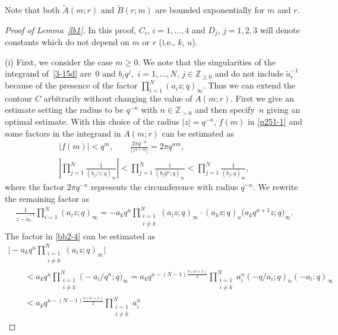 \documentclass[pdftex]{sigma}
\numberwithin{equation}{section}
\def\i{\infty}
\def\Z{\mathbb{Z}}
\begin{document}
 Note that
 both $\tilde{A}(m;r)$ and $\tilde{B}(r;m)$ are bounded exponentially for $m$ and $r$.

\begin{proof}[Proof of Lemma~\ref{lb1}]
In this proof, $C_i$, $i=1,\dots,4$ and $D_j$, $j=1,2,3$ will denote constants which do not depend on $m$ or $r$ (i.e., $k$, $u$).

(i) First, we consider the case $m\ge 0$.
We note that the singularities of the integrand of~\eqref{3-15d} are~$0$ and $b_iq^j,$ $i=1,\dots,N$, $j\in\Z_{\ge0}$ and do not include $\tilde{a}_r^{-1}$
because of the presence of the factor $\prod_{i=1}^N(a_iz;q)_{\i}$. Thus we can extend the contour $C$ arbitrarily without changing
the value of $A(m;r)$. First we give an estimate setting the radius to be $q^{-n}$ with $n\in\Z_{>0}$ and then specify~$n$ giving an optimal estimate. With this choice of the radius $|z|=q^{-n}$, $f(m)$ in \eqref{p251-1} and some factors in the integrand in $A(m;r)$
can be estimated as
\begin{gather}
 |f(m)|<q^m,
\qquad
 \frac{2\pi q^{-n}}{|z^{1+m}|}=2\pi q^{n m},\nonumber
\\
 \left|\prod_{j=1}^N\frac{1}{(b_j/z;q)_{\i}}\right|
 <\prod_{j=1}^N\frac{1}{(b_j q^n;q)_{\i}}
 <\prod_{j=1}^N\frac{1}{(b_j;q)_{\i}},\label{bb2-3}
\end{gather}
where the factor $2\pi q^{-n}$ represents
the circumference with radius $q^{-n}$.
We rewrite the remaining factor as
\begin{align}
\label{bb2-4}
 \frac{1}{z-\tilde{a}_{r}^{-1}}
 \prod_{i=1}^N(a_i z;q)_{\i}
 =
 -a_k q^{u}
 \prod_{\substack{i=1\\i\neq k}}^N(a_i z;q)_{\i}
 \cdot (a_k z;q)_{u} \big(a_k q^{u+1}z;q\big)_{\i}.
\end{align}
The factor \smash{$-a_kq^u\prod_{\substack{i=1\\i\neq k}}^N(a_i z;q)_{\i}$} in \eqref{bb2-4} can be estimated as
\begin{gather}
 \Biggl|-a_kq^u\prod_{\substack{i=1\\i\neq k}}^N(a_i z;q)_{\i}\Biggr|\nonumber\\
\qquad < a_kq^u\prod_{\substack{i=1\\i\neq k}}^N\bigl(-a_i/q^n ;q\bigr)_{\i}
 =a_k
 q^{u-(N-1)\frac{n(n+1)}{2}}
 \prod_{\substack{i=1\\i\neq k}}^N a_i^n
 (-q/a_i;q)_n(-a_i;q)_\i
 \nonumber\\
\qquad <a_k
 q^{u-(N-1)\frac{n(n+1)}{2}}
 \prod_{\substack{i=1\\i\neq k}}^N a_i^n

\end{gather}
\end{proof}
\end{document}
